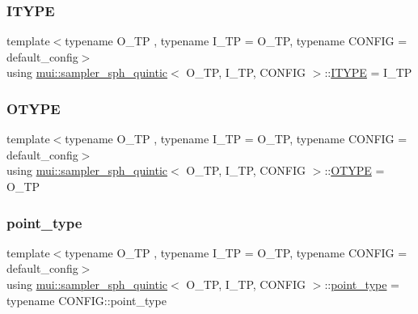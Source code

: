 \subsubsection{\texorpdfstring{I\+T\+Y\+PE}{ITYPE}}
{\footnotesize\ttfamily template$<$typename O\+\_\+\+TP , typename I\+\_\+\+TP  = O\+\_\+\+TP, typename C\+O\+N\+F\+IG  = default\+\_\+config$>$ \\
using \hyperlink{classmui_1_1sampler__sph__quintic}{mui\+::sampler\+\_\+sph\+\_\+quintic}$<$ O\+\_\+\+TP, I\+\_\+\+TP, C\+O\+N\+F\+IG $>$\+::\hyperlink{classmui_1_1sampler__sph__quintic_a3814b885ebc0a019391849f0cf976d7e}{I\+T\+Y\+PE} =  I\+\_\+\+TP}

\mbox{\label{classmui_1_1sampler__sph__quintic_ae24222e54f6ab4358ad5b89a14c7af3a}} 
\subsubsection{\texorpdfstring{O\+T\+Y\+PE}{OTYPE}}
{\footnotesize\ttfamily template$<$typename O\+\_\+\+TP , typename I\+\_\+\+TP  = O\+\_\+\+TP, typename C\+O\+N\+F\+IG  = default\+\_\+config$>$ \\
using \hyperlink{classmui_1_1sampler__sph__quintic}{mui\+::sampler\+\_\+sph\+\_\+quintic}$<$ O\+\_\+\+TP, I\+\_\+\+TP, C\+O\+N\+F\+IG $>$\+::\hyperlink{classmui_1_1sampler__sph__quintic_ae24222e54f6ab4358ad5b89a14c7af3a}{O\+T\+Y\+PE} =  O\+\_\+\+TP}

\mbox{\label{classmui_1_1sampler__sph__quintic_a81bf989d55a1247625c7783d9326d78b}} 
\subsubsection{\texorpdfstring{point\+\_\+type}{point\_type}}
{\footnotesize\ttfamily template$<$typename O\+\_\+\+TP , typename I\+\_\+\+TP  = O\+\_\+\+TP, typename C\+O\+N\+F\+IG  = default\+\_\+config$>$ \\
using \hyperlink{classmui_1_1sampler__sph__quintic}{mui\+::sampler\+\_\+sph\+\_\+quintic}$<$ O\+\_\+\+TP, I\+\_\+\+TP, C\+O\+N\+F\+IG $>$\+::\hyperlink{classmui_1_1sampler__sph__quintic_a81bf989d55a1247625c7783d9326d78b}{point\+\_\+type} =  typename C\+O\+N\+F\+I\+G\+::point\+\_\+type}

